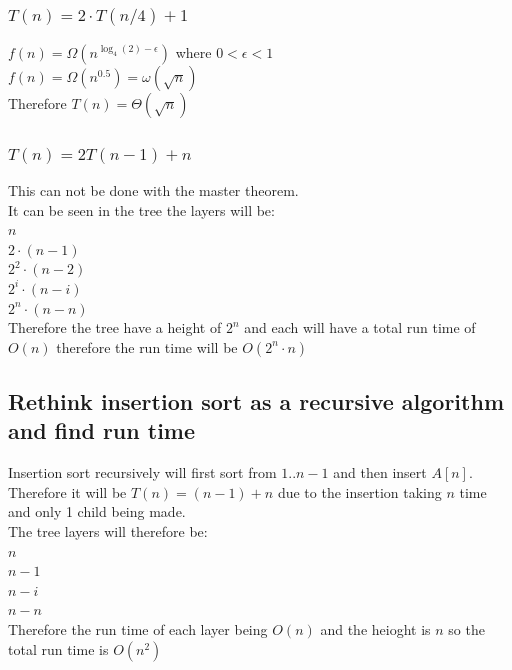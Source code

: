 \documentclass[12pt, a4paper]{article}
\begin{document}
				\subsubsection{$T(n)=2\cdot T(n/4)+1$}
					$f(n)=\Omega(n^{\log_4(2)-\epsilon})$ where $0 < \epsilon < 1$\\
					$f(n)=\Omega(n^{0.5})=\omega(\sqrt{n})$\\
					Therefore $T(n)=\Theta(\sqrt{n})$
				\subsubsection{$T(n)=2T(n-1)+n$}
					This can not be done with the master theorem.\\
					It can be seen in the tree the layers will be:\\
					$n$\\
					$2\cdot (n-1)$\\
					$2^2\cdot (n-2)$\\
					$2^i\cdot (n-i)$\\
					$2^n\cdot (n-n)$\\
					Therefore the tree have a height of $2^n$ and each will have a total run time of $O(n)$ therefore the run time will be $O(2^n\cdot n)$
			\subsection{Rethink insertion sort as a recursive algorithm and find run time}
				Insertion sort recursively will first sort from $1..n-1$ and then insert $A[n]$.\\
				Therefore it will be $T(n)=(n-1)+n$ due to the insertion taking $n$ time and only 1 child being made.\\
				The tree layers will therefore be:\\
				$n$\\
				$n-1$\\
				$n-i$\\
				$n-n$\\
				Therefore the run time of each layer being $O(n)$ and the heioght is $n$ so the total run time is $O(n^2)$
\end{document}
